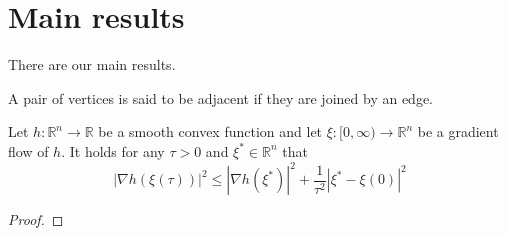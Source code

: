 %

\chapter{Main results}

There are our main results.

\begin{definition}\label{Adjacent-vertices}
   \leanok
  A pair of vertices is said to be adjacent if they are joined by an edge.
\end{definition}

\begin{lemma}\label{Luo--lemma}
   \leanok
  Let $ h: \mathbb{R}^{n} \rightarrow \mathbb{R} $ be a smooth convex function and let $ \xi:[0, \infty) \rightarrow \mathbb{R}^{n} $ be a gradient flow of $ h $. It holds for any $ \tau>0 $ and $ \xi^{*} \in \mathbb{R}^{n} $ that
  $$
  |\nabla h(\xi(\tau))|^{2} \leq\left|\nabla h\left(\xi^{*}\right)\right|^{2}+\frac{1}{\tau^{2}}\left|\xi^{*}-\xi(0)\right|^{2}
  $$

\end{lemma}

\begin{proof}
\end{proof}

